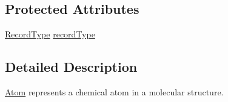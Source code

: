 \subsection*{\-Protected \-Attributes}
\begin{DoxyCompactItemize}
\item 
\hyperlink{classmoltk_1_1pdb_1_1Atom_a424f8608509c0d143813e2b02269e499}{\-Record\-Type} \hyperlink{classmoltk_1_1pdb_1_1Atom_a59b1a6294794ac810f5abb62b7407517}{record\-Type}
\end{DoxyCompactItemize}


\subsection{\-Detailed \-Description}
\hyperlink{classmoltk_1_1pdb_1_1Atom}{\-Atom} represents a chemical atom in a molecular structure. 

